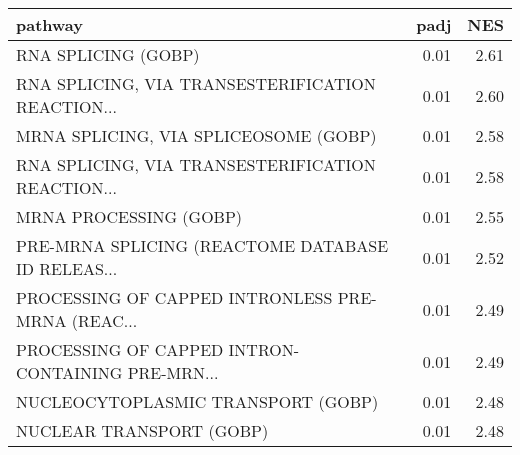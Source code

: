 \begin{tabular}{lrr}
\toprule
                                           pathway &  padj &   NES \\
\midrule
                               RNA SPLICING (GOBP) &  0.01 &  2.61 \\
 RNA SPLICING, VIA TRANSESTERIFICATION REACTION... &  0.01 &  2.60 \\
             MRNA SPLICING, VIA SPLICEOSOME (GOBP) &  0.01 &  2.58 \\
 RNA SPLICING, VIA TRANSESTERIFICATION REACTION... &  0.01 &  2.58 \\
                            MRNA PROCESSING (GOBP) &  0.01 &  2.55 \\
 PRE-MRNA SPLICING (REACTOME DATABASE ID RELEAS... &  0.01 &  2.52 \\
 PROCESSING OF CAPPED INTRONLESS PRE-MRNA (REAC... &  0.01 &  2.49 \\
 PROCESSING OF CAPPED INTRON-CONTAINING PRE-MRN... &  0.01 &  2.49 \\
                NUCLEOCYTOPLASMIC TRANSPORT (GOBP) &  0.01 &  2.48 \\
                          NUCLEAR TRANSPORT (GOBP) &  0.01 &  2.48 \\
\bottomrule
\end{tabular}
